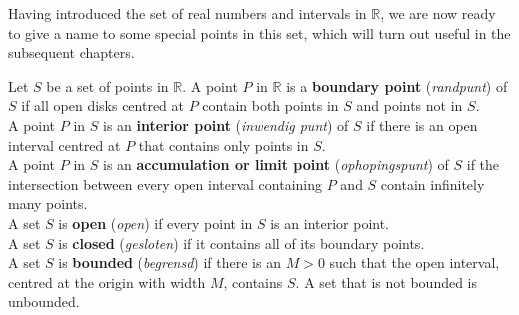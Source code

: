 	Having introduced the set of real numbers and intervals in $\mathbb{R}$, we are now ready to give a name to some special points in this set, which will turn out useful in the subsequent chapters. 
	\ifcourse
	\checkoddpage
{}
 \fi
	\begin{definition}\label{def:open1D}
		Let $S$ be a set of points in $\mathbb{R}$. A point $P$ in $\mathbb{R}$ is a \textbf{boundary point} (\textit{randpunt}) of $S$  if all open disks centred at $P$ contain both points in $S$ and points not in $S$.\\
		
		A point $P$ in $S$ is an \textbf{interior point} (\textit{inwendig punt}) of $S$ if there is an open interval centred at $P$ that contains only points in $S$. \\
		
		A point $P$ in $S$ is an \textbf{accumulation or limit point} (\textit{ophopingspunt}) of $S$ if the intersection between every open interval containing $P$ and $S$ contain infinitely many points. \\
		
		A set $S$ is \textbf{open} (\textit{open}) if every point in $S$ is an interior point.\\
		
		A set $S$ is \textbf{closed} (\textit{gesloten}) if it contains all of its boundary points.\\
		
		A set $S$ is \textbf{bounded} (\textit{begrensd}) if there is an $M>0$ such that the open interval, centred at the origin with width $M$, contains $S$. A set that is not bounded is unbounded.
	\end{definition}

